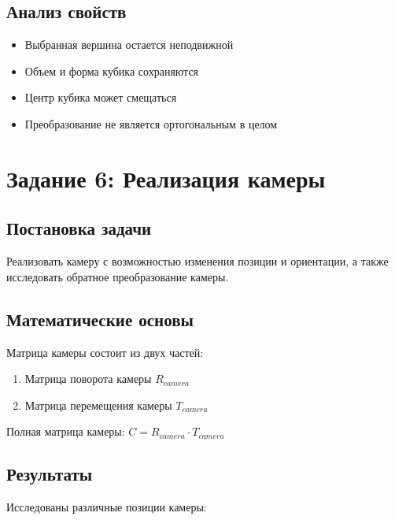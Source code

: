 \subsection*{Анализ свойств}
\begin{itemize}
    \item Выбранная вершина остается неподвижной
    \item Объем и форма кубика сохраняются
    \item Центр кубика может смещаться
    \item Преобразование не является ортогональным в целом
\end{itemize}

\section*{Задание 6: Реализация камеры}

\subsection*{Постановка задачи}
Реализовать камеру с возможностью изменения позиции и ориентации, а также исследовать обратное преобразование камеры.

\subsection*{Математические основы}
Матрица камеры состоит из двух частей:
\begin{enumerate}
    \item Матрица поворота камеры $R_{camera}$
    \item Матрица перемещения камеры $T_{camera}$
\end{enumerate}

Полная матрица камеры: $C = R_{camera} \cdot T_{camera}$

\subsection*{Результаты}
Исследованы различные позиции камеры:

